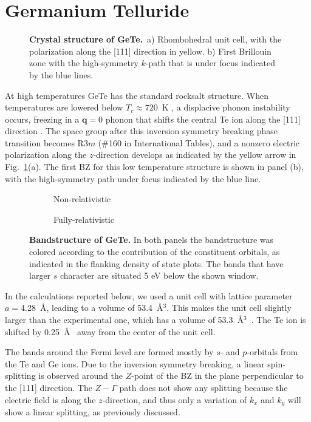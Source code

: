 \section{Germanium Telluride}
\begin{figure}[h]
\caption{\label{fig:Rashba_crystal}{\bf Crystal structure of GeTe.}~a) Rhombohedral unit cell, with the polarization along the [111] direction in yellow. b) First Brillouin zone with the high-symmetry $k$-path that is under focus indicated by the blue lines.}
\end{figure}
At high temperatures GeTe has the standard rocksalt structure.
When temperatures are lowered below $T_c \approx 720$~K \cite{DiSante2013}, a displacive phonon instability occurs, freezing in a $\bm{q} = 0$ phonon that shifts the central Te ion along the [111] direction \cite{Rabe1987}.
The space group after this inversion symmetry breaking phase transition becomes R$3m$ (\#160 in International Tables), and a nonzero electric polarization along the $z$-direction develops as indicated by the yellow arrow in Fig.~\ref{fig:Rashba_crystal}(a). The first BZ for this low temperature structure is shown in panel (b), with the high-symmetry path under focus indicated by the blue line.


\begin{figure}[b!]
	\begin{subfigure}[b]{0.49\textwidth}
	\caption{Non-relativistic}
	\end{subfigure}
	\begin{subfigure}[b]{0.49\textwidth}
	\caption{Fully-relativistic}
	\end{subfigure}
\caption{\label{fig:Rashba_bands_dos}{\bf Bandstructure of GeTe.} In both panels the bandstructure was colored according to the contribution of the constituent orbitals, as indicated in the flanking density of state plots. The bands that have larger $s$ character are situated 5 eV below the shown window.}
\end{figure}
In the calculations reported below, we used a unit cell with lattice parameter $a=$4.28~\AA, leading to a volume of 53.4~\AA$^3$.
This makes the unit cell slightly larger than the experimental one, which has a volume of 53.3~\AA$^3$~\cite{Serebryanaya1995}.
The Te ion is shifted by 0.25~\AA~ away from the center of the unit cell.

The bands around the Fermi level are formed mostly by $s$- and $p$-orbitals from the Te and Ge ions.
Due to the inversion symmetry breaking, a linear spin-splitting is observed around the $Z$-point of the BZ in the plane perpendicular to the [111] direction.
The $Z-\Gamma$ path does not show any splitting because the electric field is along the $z$-direction, and thus only a variation of $k_x$ and $k_y$ will show a linear splitting, as previously discussed.


